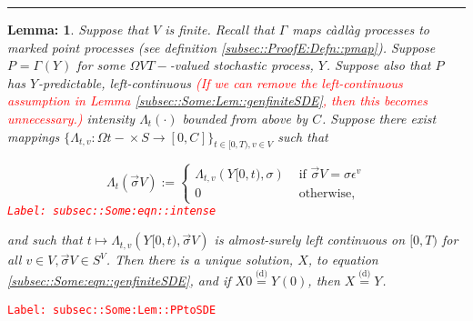 \documentclass[12pt]{article}
\newcommand{\ra}{\rightarrow}
\newcommand{\te}{\text}
\newcommand{\ep}{\epsilon}
\newcommand{\tr}{\textcolor{red}}
\newcommand{\labe}[1]{\tr{\texttt{Label: #1}}}
\newcommand{\lin}{\rule{\linewidth}{0.4 pt}}
\newcommand{\deq}{\overset{\text{(d)}}{=}}			%
\renewcommand{\v}{v}							%
\renewcommand{\S}{S}							%
\newcommand{\s}{\sigma}							%
\newcommand{\sv}{\vec{\s}}						%
\newcommand{\ev}[1]{\ep^{#1}}					%
\newcommand{\T}{T}								%
\renewcommand{\t}{t}							%
\newcommand{\X}{X}								%
\newcommand{\XState}[1]{\S^{#1}}				%
\newcommand{\rxvtt}[2]{Y_{#1}{(#2)}}				%
\newcommand{\rxvtts}[2]{Y_{#1}{#2}}					%
\newcommand{\rp}[1]{P^{#1}}							%
\newcommand{\ratee}[1]{\Lambda_{#1}}				%
\newcommand{\const}[1]{C_{#1}}						%
\newcommand{\pmap}[1]{\Gamma_{#1}}				%
\newtheorem{lem}[thms]{Lemma: }
\begin{document}
\lin

\begin{lem}
Suppose that \( V\) is finite. Recall that \(\pmap{}\) maps c\`adl\`ag processes to marked point processes (see definition \ref{subsec::ProofE:Defn::pmap}). Suppose \(\rp{} = \pmap{}(\rxvtts{}{})\) for some \(\Omega{ V}{\T-}\)-valued stochastic process, \(\rxvtts{}{}\). Suppose also that \(\rp{}\) has \(\rxvtts{}{}\)-predictable, left-continuous \tr{(If we can remove the left-continuous assumption in Lemma \ref{subsec::Some:Lem::genfiniteSDE}, then this becomes unnecessary.)} intensity \(\ratee{\t}(\cdot)\) bounded from above by \(\const{}\). Suppose there exist mappings \(\{\ratee{\t,\v}:\Omega{}{\t-}\times \S \ra [0,\const{}]\}_{\t\in[0,\T),\v\in  V}\) such that 

\begin{equation}
\ratee{\t}(\sv{}{ V}) := \begin{cases}
\ratee{\t,\v}(\rxvtts{}{[0,\t)},\s) &\te{ if } \sv{}{ V} = \s\ev{\v}\\
0 &\te{ otherwise,}
\end{cases}
\label{subsec::Some:eqn::intense}
\end{equation}
\labe{subsec::Some:eqn::intense}

and such that \(\t\mapsto \ratee{\t,\v}(\rxvtts{}{[0,\t)},\sv{}{ V})\) is almost-surely left continuous on \([0,\T)\) for all \(\v\in  V,\sv{}{ V}\in \S^ V\). Then there is a unique solution, \(\X{}{}\), to equation \eqref{subsec::Some:eqn::genfiniteSDE}, and if \(\X{}{0} \deq \rxvtt{}{0}\), then \(\X{}{} \deq \rxvtts{}{}\).

\label{subsec::Some:Lem::PPtoSDE}
\end{lem}
\labe{subsec::Some:Lem::PPtoSDE}
\end{document}
